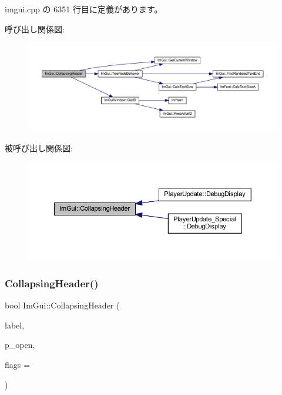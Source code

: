  imgui.\+cpp の 6351 行目に定義があります。

呼び出し関係図\+:\nopagebreak
\begin{figure}[H]
\begin{center}
\leavevmode
\includegraphics[width=350pt]{namespace_im_gui_ab52f9e08698c9d64abb05b98f5355146_cgraph}
\end{center}
\end{figure}
被呼び出し関係図\+:\nopagebreak
\begin{figure}[H]
\begin{center}
\leavevmode
\includegraphics[width=350pt]{namespace_im_gui_ab52f9e08698c9d64abb05b98f5355146_icgraph}
\end{center}
\end{figure}
\mbox{\label{namespace_im_gui_a19f369fc61f49ab7995ebb4da99028db}} 
\subsubsection{\texorpdfstring{Collapsing\+Header()}{CollapsingHeader()}\hspace{0.1cm}{\footnotesize\ttfamily [2/2]}}
{\footnotesize\ttfamily bool Im\+Gui\+::\+Collapsing\+Header (\begin{DoxyParamCaption}\item[{const char $\ast$}]{label,  }\item[{bool $\ast$}]{p\+\_\+open,  }\item[{\mbox{\hyperlink{imgui_8h_a0588fdd10c59b49a0159484fe9ec4564}{Im\+Gui\+Tree\+Node\+Flags}}}]{flags = {} }\end{DoxyParamCaption})}



